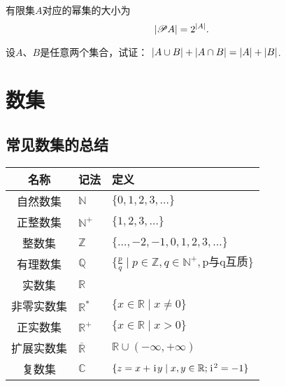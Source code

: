 \begin{property}
有限集\(A\)对应的幂集的大小为\[
	\abs{\mathscr{P} A} = 2^{\abs{A}}.
\]
\end{property}

\begin{example}
设\(A\)、\(B\)是任意两个集合，试证：
\(\abs{A \cup B} + \abs{A \cap B} = \abs{A} + \abs{B}\).
\end{example}

\section{数集}
\subsection{常见数集的总结}
\begin{center}
\begin{tabular}{c|l|l}
\hline
名称 & 记法 & 定义 \\ \hline
自然数集 & \(\mathbb{N}\) & \(\{ 0,1,2,3,\dotsc \}\) \\
正整数集 & \(\mathbb{N}^+\) & \(\{ 1,2,3,\dotsc \}\) \\
整数集 & \(\mathbb{Z}\) & \(\{ \dotsc,-2,-1,0,1,2,3,\dotsc \}\) \\
有理数集 & \(\mathbb{Q}\) & \(\{ \frac{p}{q} \mid p \in \mathbb{Z}, q \in \mathbb{N}^+, \text{p与q互质} \}\) \\
实数集 & \(\mathbb{R}\) \\
非零实数集 & \(\mathbb{R}^*\) & \(\{ x \in \mathbb{R} \mid x \neq 0 \}\) \\
正实数集 & \(\mathbb{R}^+\) & \(\{ x \in \mathbb{R} \mid x > 0 \}\) \\
扩展实数集 & \(\overline{\mathbb{R}}\) & \(\mathbb{R} \cup (-\infty,+\infty)\) \\
复数集 & \(\mathbb{C}\) & \(\{ z = x + \kern1pt\mathrm{i}\kern1pt y \mid x,y \in \mathbb{R}; \kern1pt\mathrm{i}\kern1pt^2 = -1 \}\) \\ \hline
\end{tabular}
\end{center}

